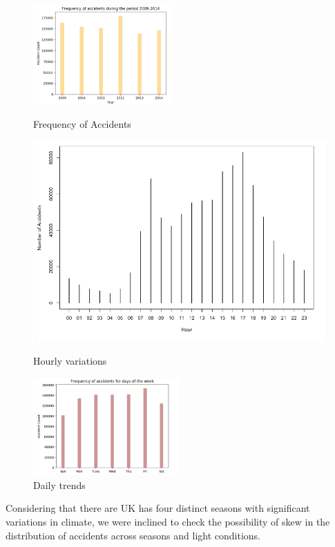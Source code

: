 \documentclass{neu_handout}
\begin{document}
\begin{figure}[!htb]
  \includegraphics[height=3.80cm, width=.9\linewidth]{counts.png}
  \caption{Frequency of Accidents}\label{fig:frequency}
\endminipage\hfill
{}
  \includegraphics[width=\linewidth]{hour-study.png}
  \caption{Hourly variations}\label{fig:hour-study}
\endminipage\hfill
{}
  \includegraphics[height=3.75cm, width=\linewidth]{day-study.png}
  \caption{Daily trends}\label{fig:day_study}
\endminipage
\end{figure}

Considering that there are UK  has four distinct seasons with significant variations in climate, we were inclined to check the possibility of skew in the distribution of accidents across seasons
and light conditions. \\
\end{document}
